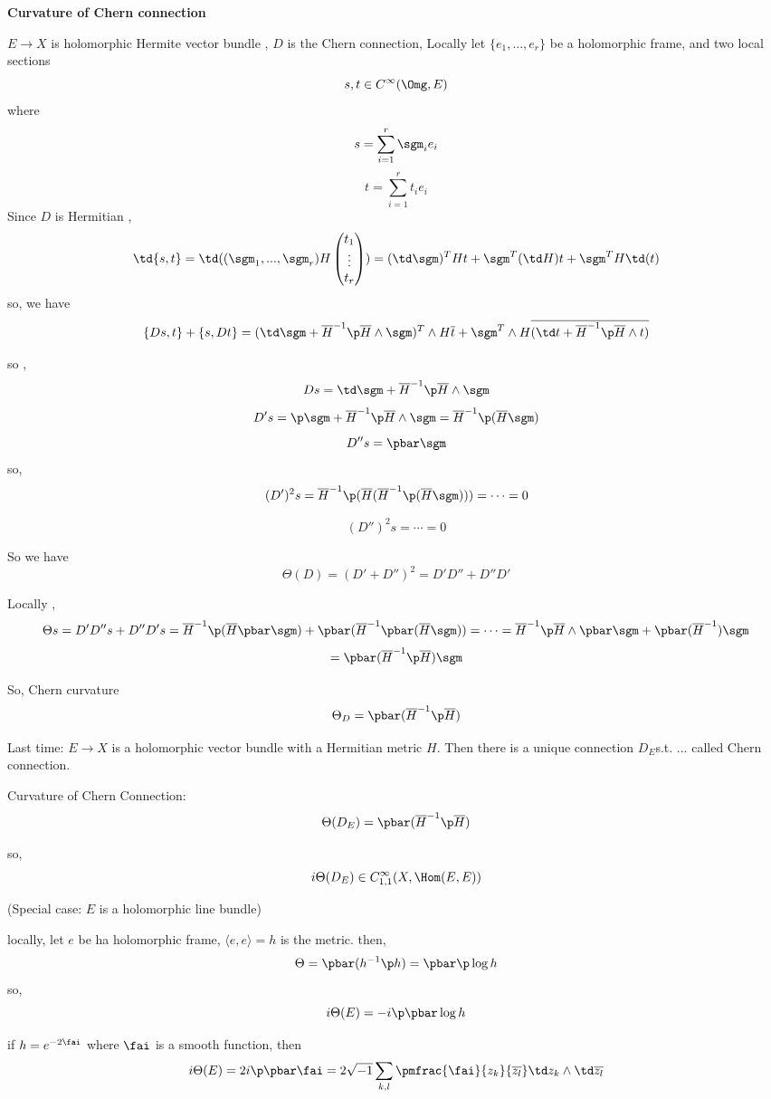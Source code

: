 \textbf{Curvature of Chern connection}

$E\to X$ is holomorphic Hermite vector bundle , $D$ is the Chern connection,
Locally let $\{e_1,...,e_r\}$ be a holomorphic frame, and two local sections
$$s,t\in C^\infty(\Omg, E)$$
where
$$s=\sum_{i=1}^r\sgm_ie_i$$
$$t=\sum_{i=1}^r t_ie_i$$
Since $D$ is Hermitian ,
$$\td \{s,t\}=\td ((\sgm_1,...,\sgm_r)H
\begin{pmatrix}
t_1\\
\vdots\\
t_r
\end{pmatrix})
=(\td\sgm)^THt+\sgm^T(\td H)t+\sgm^TH\td(t)
$$
so, we have
$$\{Ds,t\}+\{s,Dt\}=(\td\sgm+\overline{H}^{-1}\p\overline{H}\wedge\sgm)^T\wedge H\overline{t}
+\sgm^T\wedge H\overline{(\td t+\overline{H}^{-1}\p\overline{H}\wedge t)}$$

so ,
$$Ds=\td\sgm+\overline{H}^{-1}\p\overline{H}\wedge\sgm$$
$$D's=\p\sgm+\overline{H}^{-1}\p\overline{H}\wedge\sgm
=\overline{H}^{-1}\p(\overline{H}\sgm)$$
$$D''s=\pbar\sgm$$
so,
$$(D')^2s=\overline{H}^{-1}\p(\overline{H}(\overline{H}^{-1}\p(\overline{H}\sgm)))
=\cdots=0$$

$$(D'')^2s=\cdots=0$$

So we have
$$\Theta(D)=(D'+D'')^2=D'D''+D''D'$$

Locally ,
$$\Theta s=D'D''s+D''D's=\overline{H}^{-1}\p(\overline{H}\pbar\sgm)
+\pbar(\overline{H}^{-1}\pbar(\overline{H}\sgm))
=\cdots=\overline{H}^{-1}\p\overline{H}\wedge\pbar\sgm
+\pbar(\overline{H}^{-1})\sgm
$$
$$
  = \pbar(\overline{H}^{-1}\p\overline{H})\sgm
$$

So, Chern curvature
$$\Theta_D=\pbar(\overline{H}^{-1}\p\overline{H})$$


Last time: $E\to X$ is a holomorphic vector bundle
with a Hermitian metric $H$.
Then there is a unique connection $D_E$s.t. ... called Chern connection.

Curvature of Chern Connection:
$$\Theta(D_E)=\pbar(\overline{H}^{-1}\p\overline{H})$$

so,
$$i\Theta(D_E)\in C_{1,1}^\infty(X,\Hom(E,E))$$

\begin{example}(Special case: $E$ is  a holomorphic line bundle)

locally, let $e$ be ha holomorphic frame,
$\langle e,e\rangle=h$ is the metric.
then,
$$\Theta=\pbar(h^{-1}\p h)=\pbar\p\log h$$
so,
$$i\Theta(E)=-i\p\pbar\log h$$
\end{example}
if $h=e^{-2\fai}$ where $\fai$ is a smooth function, then
$$i\Theta(E)=2i\p\pbar\fai
=2\sqrt{-1}\sum_{k,l}\pmfrac{\fai}{z_k}{\overline{z_l}}
\td z_k\wedge\td\overline{z_l}
$$

